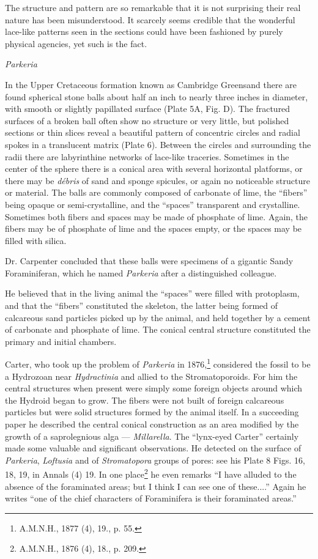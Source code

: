 \documentclass[a4paper, 12pt, oneside]{article}
\begin{document}
The structure and pattern are so remarkable that it is not surprising their real nature has been misunderstood. It scarcely seems credible that the wonderful lace-like patterns seen in the sections could have been fashioned by purely physical agencies, yet such is the fact.

\bigskip
\centerline{\emph{Parkeria}}

In the Upper Cretaceous formation known as Cambridge Greensand there are found spherical stone balls about half an inch to nearly three inches in diameter, with smooth or slightly papillated surface (Plate 5A, Fig. D). The fractured surfaces of a broken ball often show no structure or very little, but polished sections or thin slices reveal a beautiful pattern of concentric circles and radial spokes in a translucent matrix (Plate 6). Between the circles and surrounding the radii there are labyrinthine networks of lace-like traceries. Sometimes in the center of the sphere there is a conical area with several horizontal platforms, or there may be \emph{débris} of sand and sponge spicules, or again no noticeable structure or material. The balls are commonly composed of carbonate of lime, the ``fibers'' being opaque or semi-crystalline, and the ``spaces'' transparent and crystalline. Sometimes both fibers and spaces may be made of phosphate of lime. Again, the fibers may be of phosphate of lime and the spaces empty, or the spaces may be filled with silica.

Dr. Carpenter concluded that these balls were specimens of a gigantic Sandy Foraminiferan, which he named \emph{Parkeria} after a distinguished colleague.

He believed that in the living animal the ``spaces'' were filled with protoplasm, and that the ``fibers'' constituted the skeleton, the latter being formed of calcareous sand particles picked up by the animal, and held together by a cement of carbonate and phosphate of lime. The conical central structure constituted the primary and initial chambers.

Carter, who took up the problem of \emph{Parkeria} in 1876,\footnote{A.M.N.H., 1877 (4), 19., p. 55.} considered the fossil to be a Hydrozoan near \emph{Hydractinia} and allied to the Stromatoporoids. For him the central structures when present were simply some foreign objects around which the Hydroid began to grow. The fibers were not built of foreign calcareous particles but were solid structures formed by the animal itself. In a succeeding paper he described the central conical construction as an area modified by the growth of a saprolegnious alga --- \emph{Millarella}. The ``lynx-eyed Carter'' certainly made some valuable and significant observations. He detected on the surface of \emph{Parkeria}, \emph{Loftusia} and of \emph{Stromatopora} groups of pores: see his Plate 8 Figs. 16, 18, 19, in Annals (4) 19. In one place\footnote{A.M.N.H., 1876 (4), 18., p. 209.} he even remarks ``I have alluded to the absence of the foraminated areas; but I think I can see one of these....'' Again he writes ``one of the chief characters of Foraminifera is their foraminated areas.''
\end{document}
